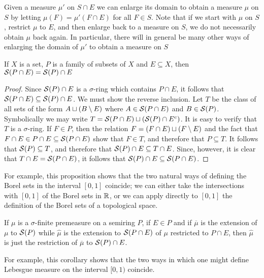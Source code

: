 Given a measure $\mu'$ on $S \cap E$ we can enlarge its domain to obtain a measure $\mu$ on $S$ by letting $\mu(F)=\mu'(F \cap E)$ for all $F \in S$. Note that if we start with $\mu$ on $S$, restrict $\mu$ to $E$, and then enlarge back to a measure on $S$, we do not necessarily obtain $\mu$ back again. In particular, there will in general be many other ways of enlarging the domain of $\mu'$ to obtain a measure on $S$

\begin{proposition}
\label{prop:sring generated by intersection}
If $X$ is a set, $P$ is a family of subsets of $X$ and $E \subseteq X$, then ${\cal S}(P \cap E)={\cal S}(P) \cap E$
\end{proposition}


\begin{proof}
Since ${\cal S}(P) \cap E$ is a $\sigma$-ring which contains $P \cap E$, it follows that ${\cal S}(P \cap E) \subseteq {\cal S}(P) \cap E$. We must show the reverse inclusion. Let $T$ be the class of all sets of the form $A\sqcup(B\setminus E)$ where $A \in {\cal S}(P \cap E)$ and $B \in {\cal S}(P)$. Symbolically we may write $T={\cal S}(P \cap E)\sqcup({\cal S}(P)\cap{E}^c)$. It is easy to verify that $T$ is a $\sigma$-ring. If $F \in P$, then the relation $F=(F \cap E) \sqcup(F\setminus E)$ and the fact that $F \cap E\in P\cap E\subseteq {\cal S}(P \cap E)$ show that $F \in T$, and therefore that $P \subseteq T$. It follows that ${\cal S}(P) \subseteq T$, and therefore that ${\cal S}(P) \cap E\subseteq T\cap E$. Since, however, it is clear that $T \cap E={\cal S}(P \cap E)$, it follows that ${\cal S}(P) \cap E\subseteq {\cal S}(P \cap E)$.
\end{proof}

For example, this proposition shows that the two natural ways of defining the Borel sets in the interval $[0,1]$ coincide; we can either take the intersections with $[0,1]$ of the Borel sets in $\mathbb{R}$, or we can apply directly to $[0,1]$ the definition of the Borel sets of a topological space.

\begin{corollary}
If $\mu$ is a $\sigma$-finite premeasure on a semiring $P$, if $E \in P$ and if $\overline{\mu}$ is the extension of $\mu$ to ${\cal S}(P)$ while $\widehat{\mu}$ is the extension to ${\cal S}(P \cap E)$ of $\mu$ restricted to $P \cap E$, then $\widehat{\mu}$ is just the restriction of $\overline{\mu}$ to ${\cal S}(P) \cap E$.
\end{corollary}

For example, this corollary shows that the two ways in which one might define Lebesgue measure on the interval $[0, 1)$ coincide.


